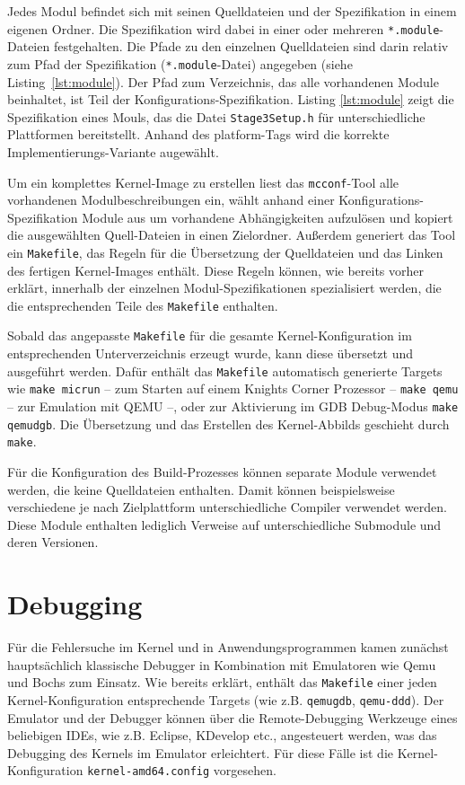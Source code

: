 Jedes Modul befindet sich mit seinen Quelldateien und der Spezifikation in einem
eigenen Ordner. Die Spezifikation wird dabei in einer oder mehreren
\texttt{*.module}-Dateien festgehalten. Die Pfade zu den einzelnen Quelldateien
sind darin relativ zum Pfad der Spezifikation (\texttt{*.module}-Datei)
angegeben (siehe Listing~\ref{lst:module}). Der Pfad zum Verzeichnis, das alle
vorhandenen Module beinhaltet, ist Teil der Konfigurations-Spezifikation.
Listing \ref{lst:module} zeigt die Spezifikation eines Mouls, das die Datei
\texttt{Stage3Setup.h} für unterschiedliche Plattformen bereitstellt. Anhand des
platform-Tags wird die korrekte Implementierungs-Variante augewählt.

Um ein komplettes Kernel-Image zu erstellen liest das \texttt{mcconf}-Tool alle
vorhandenen Modulbeschreibungen ein, wählt anhand einer
Konfigurations-Spezifikation Module aus um vorhandene Abhängigkeiten aufzulösen
und kopiert die ausgewählten Quell-Dateien in einen Zielordner.
Außerdem generiert das Tool ein \texttt{Makefile}, das Regeln für die
Übersetzung der Quelldateien und das Linken des fertigen Kernel-Images enthält.
Diese Regeln können, wie bereits vorher erklärt, innerhalb der einzelnen
Modul-Spezifikationen spezialisiert werden, die die entsprechenden Teile des
\texttt{Makefile} enthalten.

Sobald das angepasste \texttt{Makefile} für die gesamte Kernel-Konfiguration im
entsprechenden Unterverzeichnis erzeugt wurde, kann diese übersetzt und
ausgeführt werden. Dafür enthält das \texttt{Makefile} automatisch generierte
Targets wie \texttt{make micrun} -- zum Starten auf einem Knights Corner
Prozessor -- \texttt{make qemu} -- zur Emulation mit QEMU --, oder zur
Aktivierung im GDB Debug-Modus \texttt{make qemudgb}. Die Übersetzung und das
Erstellen des Kernel-Abbilds geschieht durch \texttt{make}. 

Für die Konfiguration des Build-Prozesses können separate Module verwendet
werden, die keine Quelldateien enthalten. Damit können beispielsweise
verschiedene je nach Zielplattform  unterschiedliche Compiler verwendet werden.
Diese Module enthalten lediglich Verweise auf unterschiedliche
Submodule  und deren Versionen. 

\section{Debugging}
Für die Fehlersuche im Kernel und in Anwendungsprogrammen kamen zunächst
hauptsächlich klassische Debugger in Kombination mit Emulatoren wie Qemu und
Bochs zum Einsatz. Wie bereits erklärt, enthält das \texttt{Makefile} einer
jeden Kernel-Konfiguration entsprechende Targets (wie z.B. \texttt{qemugdb},
\texttt{qemu-ddd}). Der Emulator und der Debugger können über
die Remote-Debugging Werkzeuge eines beliebigen IDEs, wie z.B. Eclipse, KDevelop
etc., angesteuert werden, was das Debugging des Kernels im Emulator erleichtert.
Für diese Fälle ist die Kernel-Konfiguration \texttt{kernel-amd64.config}
vorgesehen.

